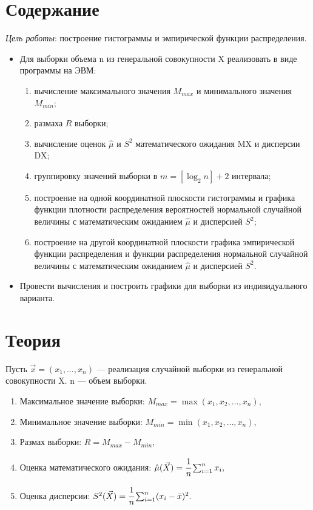 
\chapter{Содержание}

\textit{Цель работы}: построение гистограммы и эмпирической функции распределения.
\begin{itemize}
	\item Для выборки объема n из генеральной совокупности X реализовать в виде программы на ЭВМ:
	\begin{enumerate}
		\item вычисление максимального значения $M_{max}$ и минимального значения $M_{min}$;
		\item размаха $R$ выборки;
		\item вычисление оценок $\hat{\mu}$ и $S^2$ математического ожидания MX и дисперсии DX;
		\item группировку значений выборки в $m = [\log_2n] + 2$ интервала;
		\item построение на одной координатной плоскости гистограммы и графика функции плотности распределения вероятностей нормальной случайной величины с математическим ожиданием $\hat{\mu}$ и дисперсией $S^2$;
		\item построение на другой координатной плоскости графика эмпирической функции распределения и функции распределения нормальной случайной величины с математическим ожиданием $\hat{\mu}$ и дисперсией $S^2$.
	\end{enumerate}
	\item Провести вычисления и построить графики для выборки из индивидуального варианта.
\end{itemize}


\chapter{Теория}

Пусть $\vec{x} = (x_1, \dots, x_n)$ --- реализация случайной
выборки из генеральной совокупности X. n --- объем выборки.

\begin{enumerate}[wide=0pt]
	\item Максимальное значение выборки: $M_{max} = \max{(x_1, x_2, \dots, x_n)},$

	\item Минимальное значение выборки: $M_{min} = \min{(x_1, x_2, \dots, x_n)},$

	\item Размах выборки: $R = M_{max} - M_{min},$

	\item Оценка математического ожидания: $\hat{\mu}(\vec{X}) = \cfrac{1}{n}\sum_{i = 1}^{n}x_i,$

	\item Оценка дисперсии: $S^2(\vec{X}) = \cfrac{1}{n}\sum_{i = 1}^{n}(x_i - \bar{x})^2.$
\end{enumerate}



